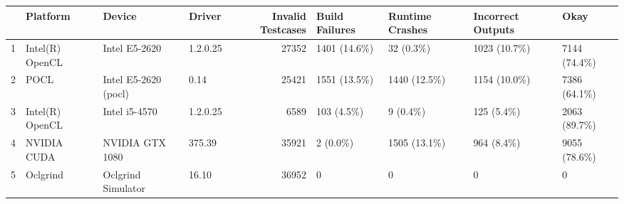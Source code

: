 \begin{tabular}{llllrllll}
\toprule
{} &         Platform &                Device &    Driver &  Invalid Testcases & Build Failures & Runtime Crashes & Incorrect Outputs &          Okay \\
\midrule
1 &  Intel(R) OpenCL &         Intel E5-2620 &  1.2.0.25 &              27352 &   1401 (14.6\%) &       32 (0.3\%) &      1023 (10.7\%) &  7144 (74.4\%) \\
2 &             POCL &  Intel E5-2620 (pocl) &      0.14 &              25421 &   1551 (13.5\%) &    1440 (12.5\%) &      1154 (10.0\%) &  7386 (64.1\%) \\
3 &  Intel(R) OpenCL &         Intel i5-4570 &  1.2.0.25 &               6589 &     103 (4.5\%) &        9 (0.4\%) &        125 (5.4\%) &  2063 (89.7\%) \\
4 &      NVIDIA CUDA &       NVIDIA GTX 1080 &    375.39 &              35921 &       2 (0.0\%) &    1505 (13.1\%) &        964 (8.4\%) &  9055 (78.6\%) \\
5 &         Oclgrind &    Oclgrind Simulator &     16.10 &              36952 &              0 &               0 &                 0 &             0 \\
\bottomrule
\end{tabular}

